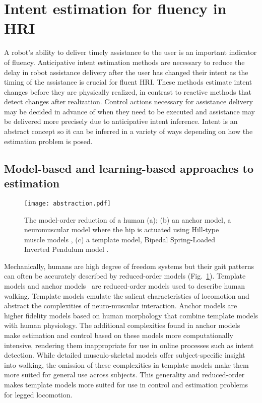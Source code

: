 \section{Intent estimation for fluency in HRI}

A robot's ability to deliver timely assistance to the user is an important indicator of fluency. Anticipative intent estimation methods are necessary to reduce the delay in robot assistance delivery after the user has changed their intent as the timing of the assistance is crucial for fluent HRI. These methods estimate intent changes before they are physically realized, in contrast to reactive methods that detect changes after realization. Control actions necessary for assistance delivery may be decided in advance of when they need to be executed and assistance may be delivered more precisely due to anticipative intent inference. Intent is an abstract concept so it can be inferred in a variety of ways depending on how the estimation problem is posed.

\subsection{Model-based and learning-based approaches to estimation}
\begin{figure}
	\centering
	\texttt{[image: abstraction.pdf]}
	\caption{The model-order reduction of a human (a); (b) an anchor model, a neuromuscular model where the hip is actuated using Hill-type muscle models \cite{davoodi2019template}, (c) a template model, Bipedal Spring-Loaded Inverted Pendulum model \cite{geyer2006compliant}. }\label{fig:abstraction}
\end{figure}

Mechanically, humans are high degree of freedom systems but their gait patterns can often be accurately described by reduced-order models (Fig.~\ref{fig:abstraction}). Template models and anchor models~\cite{full1999templates} are reduced-order models used to describe human walking. Template models emulate the salient characteristics of locomotion and abstract the complexities of neuro-muscular interaction. Anchor models are higher fidelity models based on human morphology that combine template models with human physiology. The additional complexities found in anchor models make estimation and control based on these models more computationally intensive, rendering them inappropriate for use in online processes such as intent detection. While detailed musculo-skeletal models offer subject-specific insight into walking, the omission of these complexities in template models make them more suited for general use across subjects. This generality and reduced-order makes template models more suited for use in control and estimation problems for legged locomotion.

